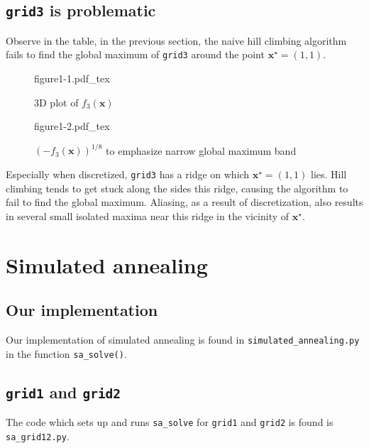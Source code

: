 \documentclass[11pt,oneside]{article}
\newcommand{\vect}[1]{\boldsymbol{#1}}
\begin{document}
\newpage

\subsection{\texttt{grid3} is problematic}

Observe in the table, in the previous section, the naive hill climbing algorithm fails
to find the global maximum of \texttt{grid3} around the point $\vect{x}^\star=(1,1)$.

\begin{figure}[h!]
    \centering
    \caption{3D plot of $f_3(\vect{x})$}
    \def\svgwidth{0.6\textwidth}
    {figure1-1.pdf_tex}
\end{figure}

\begin{figure}[h!]
    \centering
    \caption{$(-f_3(\vect{x}))^{1/8}$ to emphasize narrow global maximum band}
    \def\svgwidth{0.5\textwidth}
    {figure1-2.pdf_tex}
\end{figure}

Especially when discretized, \texttt{grid3} has a ridge on which $\vect{x}^\star=(1,1)$
lies. Hill climbing tends to get stuck along the sides this ridge, causing the
algorithm to fail to find the global maximum. Aliasing, as a result of discretization,
also results in several small isolated maxima near this ridge in the vicinity of 
$\vect{x}^\star$.

\newpage

\section{Simulated annealing}

\subsection{Our implementation}

Our implementation of simulated annealing is found in \texttt{simulated\_annealing.py}
in the function \texttt{sa\_solve()}.

\subsection{\texttt{grid1} and \texttt{grid2}}

The code which sets up and runs \texttt{sa\_solve} for \texttt{grid1} and \texttt{grid2}
is found is \texttt{sa\_grid12.py}.
\end{document}
